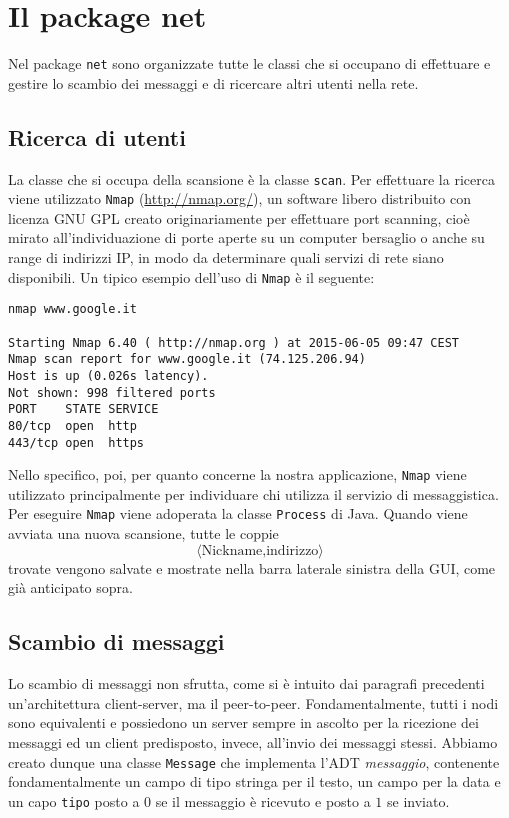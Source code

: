\section{Il package net}
Nel package \texttt{net} sono organizzate tutte le classi che si occupano di effettuare e gestire lo
scambio dei messaggi e di ricercare altri utenti nella rete.

\subsection{Ricerca di utenti}
La classe che si occupa della scansione è la classe \texttt{scan}. Per effettuare la
ricerca viene utilizzato \texttt{Nmap} (\url{http://nmap.org/}),  un software libero distribuito con licenza GNU GPL
creato originariamente per effettuare port scanning, cioè mirato all'individuazione di porte aperte
su un computer bersaglio o anche su range di indirizzi IP, in modo da determinare quali
servizi di rete siano disponibili. Un tipico esempio dell'uso di \texttt{Nmap} è il seguente:

\begin{lstlisting}
nmap www.google.it

Starting Nmap 6.40 ( http://nmap.org ) at 2015-06-05 09:47 CEST
Nmap scan report for www.google.it (74.125.206.94)
Host is up (0.026s latency).
Not shown: 998 filtered ports
PORT    STATE SERVICE
80/tcp  open  http
443/tcp open  https
\end{lstlisting}

Nello specifico, poi, per quanto concerne la nostra applicazione, \texttt{Nmap}
viene utilizzato principalmente per individuare chi utilizza il servizio di messaggistica.
Per eseguire \texttt{Nmap} viene adoperata la classe \texttt{Process} di Java.
Quando viene avviata una nuova scansione, tutte le coppie
$$ \langle \text{Nickname,indirizzo} \rangle $$
trovate vengono salvate e mostrate nella barra laterale sinistra della GUI, come già
anticipato sopra.

\subsection{Scambio di messaggi}
Lo scambio di messaggi non sfrutta, come si è intuito dai paragrafi precedenti un'architettura
client-server, ma il peer-to-peer. Fondamentalmente, tutti i nodi sono equivalenti e possiedono
un server sempre in ascolto per la ricezione dei messaggi ed un client predisposto, invece, all'invio
dei messaggi stessi. Abbiamo creato dunque una classe \texttt{Message} che implementa l'ADT
\textit{messaggio}, contenente fondamentalmente un campo di tipo stringa per il testo, un campo
per la data e un capo \texttt{tipo} posto a $0$ se il messaggio è ricevuto e posto a $1$ se inviato.

